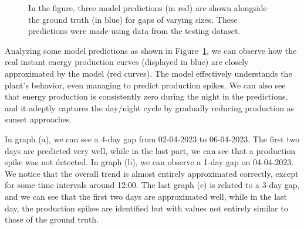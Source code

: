 \begin{figure}[H]
\begin{subfigure}{\textwidth}
		\caption{}
	\end{subfigure}
	\caption{In the figure, three model predictions (in red) are shown alongside the ground truth (in blue) for gaps of varying sizes. These predictions were made using data from the testing dataset.}
	\label{fig:grrunevalplots}
\end{figure}
\newpage
Analyzing some model predictions as shown in
Figure~\ref{fig:grrunevalplots}, we can observe how the real
instant energy production curves (displayed in blue) are
closely approximated by the model (red curves).
The model effectively understands the plant's behavior,
even managing to predict production spikes.
We can also see that energy production is consistently zero during
the night in the predictions, and it adeptly captures the
day/night cycle by gradually reducing production as sunset approaches.

In graph (a), we can see a 4-day gap from 02-04-2023 to 06-04-2023.
The first two days are predicted very well, while in the last part,
we can see that a production spike was not detected.
In graph (b), we can observe a 1-day gap on 04-04-2023. We notice that the overall trend is almost entirely approximated correctly, except for some time intervals around 12:00.
The last graph (c) is related to a 3-day gap, and we can see that the first two days are approximated well, while in the last day, the production spikes are identified but with values not entirely similar to those of the ground truth.


